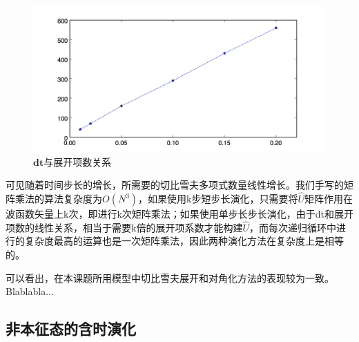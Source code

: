 \begin{figure}[hbt]
  \centering
  \captionsetup{justification=centering}
  \vspace{-1mm}
  \includegraphics[width=0.99\linewidth]{dt-M/dt-M}
  \caption{$\boldsymbol{dt}$与展开项数关系}
  \label{fig:dt-M}
\end{figure}

可见随着时间步长的增长，所需要的切比雪夫多项式数量线性增长。我们手写的矩阵乘法的算法复杂度为$O(N^3)$，如果使用k步短步长演化，只需要将$\hat{U}$矩阵作用在波函数矢量上k次，即进行k次矩阵乘法；如果使用单步长步长演化，由于dt和展开项数的线性关系，相当于需要k倍的展开项系数才能构建$\hat{U}$，而每次递归循环中进行的复杂度最高的运算也是一次矩阵乘法，因此两种演化方法在复杂度上是相等的。

可以看出，在本课题所用模型中切比雪夫展开和对角化方法的表现较为一致。Blablabla...

\subsection{非本征态的含时演化} 